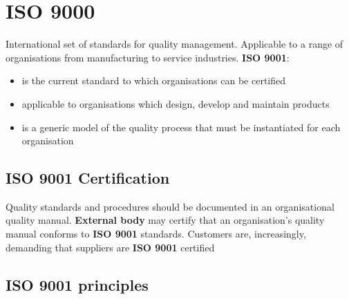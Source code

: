\documentclass{article}
\begin{document}
\section{ISO 9000}
\begin{flushleft}
International set of standards for quality management. Applicable to a range of organisations from manufacturing to service industries. \textbf{ISO 9001}:
\end{flushleft}
\begin{itemize}
  \item is the current standard to which organisations can be certified
  \item applicable to organisations which design, develop and maintain products
  \item is a generic model of the quality process that must be instantiated for each organisation
\end{itemize}

\subsection{ISO 9001 Certification}

\begin{flushleft}
Quality standards and procedures should be documented in an organisational quality manual. \textbf{External body} may certify that an organisation’s quality manual conforms to \textbf{ISO 9001} standards. Customers are, increasingly, demanding that suppliers are \textbf{ISO 9001} certified
\end{flushleft}

\subsection{ISO 9001 principles}
\end{document}
